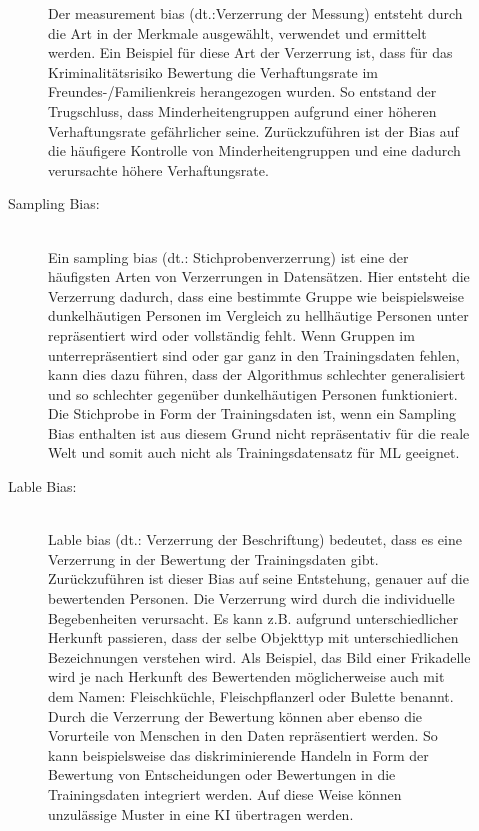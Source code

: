 \begin{onehalfspace}
\begin{description}
\begin{description}
                Der \glqq{}measurement bias\grqq{} (\ac*{dt}.:Verzerrung der Messung) entsteht durch die Art in der Merkmale ausgewählt, verwendet und ermittelt werden. Ein Beispiel für diese Art der Verzerrung ist, dass für das Kriminalitätsrisiko Bewertung die Verhaftungsrate im Freundes-/Familienkreis herangezogen wurden. So entstand der Trugschluss, dass Minderheitengruppen aufgrund einer höheren Verhaftungsrate gefährlicher seine. Zurückzuführen ist der Bias auf die häufigere Kontrolle von Minderheitengruppen und eine dadurch verursachte höhere Verhaftungsrate.\cite{silberg2019notes}\cite{srinivasan2021biases}\cite{Mehrabi2021}
                \item [Sampling Bias:] \hfill \\
                Ein \glqq{}sampling bias\grqq{} (\ac*{dt}.: Stichprobenverzerrung) ist eine der häufigsten Arten von Verzerrungen in Datensätzen. Hier entsteht die Verzerrung dadurch, dass eine bestimmte Gruppe wie beispielsweise dunkelhäutigen Personen im Vergleich zu hellhäutige Personen unter repräsentiert wird oder vollständig fehlt. Wenn Gruppen im unterrepräsentiert sind oder gar ganz in den Trainingsdaten fehlen, kann dies dazu führen, dass der Algorithmus schlechter generalisiert und so schlechter gegenüber dunkelhäutigen Personen funktioniert. Die Stichprobe in Form der Trainingsdaten ist, wenn ein Sampling Bias enthalten ist aus diesem Grund nicht repräsentativ für die reale Welt und somit auch nicht als Trainingsdatensatz für \ac*{ML} geeignet.\cite{srinivasan2021biases}\cite{Mehrabi2021}
                \item [Lable Bias:] \hfill \\
                \glqq{}Lable bias\grqq{} (\ac*{dt}.: Verzerrung der Beschriftung) bedeutet, dass es eine Verzerrung in der Bewertung der Trainingsdaten gibt. Zurückzuführen ist dieser Bias auf seine Entstehung, genauer auf die bewertenden Personen. Die Verzerrung wird durch die individuelle Begebenheiten verursacht. Es kann z.B. aufgrund unterschiedlicher Herkunft passieren, dass der selbe Objekttyp mit unterschiedlichen Bezeichnungen verstehen wird. Als Beispiel, das Bild einer Frikadelle wird je nach Herkunft des Bewertenden möglicherweise auch mit dem Namen: Fleischküchle, Fleischpflanzerl oder Bulette benannt.
                Durch die Verzerrung der Bewertung können aber ebenso die Vorurteile von Menschen in den Daten repräsentiert werden. So kann beispielsweise das diskriminierende Handeln in Form der Bewertung von Entscheidungen oder Bewertungen in die Trainingsdaten integriert werden. Auf diese Weise können unzulässige Muster in eine \ac*{KI} übertragen werden.\cite{srinivasan2021biases}
            \end{description}
            

\end{description}
\end{onehalfspace}
